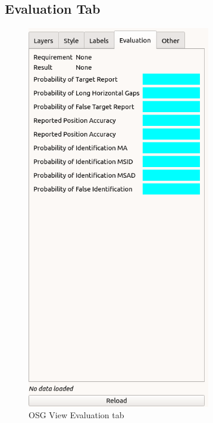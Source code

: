 \subsection{Evaluation Tab}
\label{sec:osgview_eval_tab} 

\begin{figure}[H]
   \center
    \includegraphics[width=8cm,frame]{figures/osgview_eval_tab.png}
  \caption{OSG View Evaluation tab}
\end{figure}
